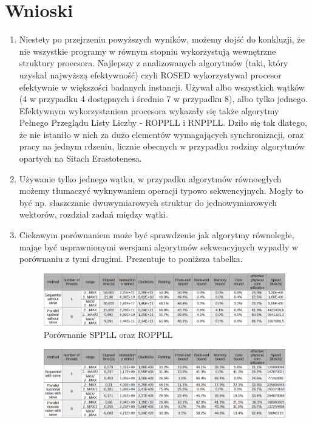 \documentclass{article}
\begin{document}
    \section{Wnioski}    
        \begin{enumerate}
            \item Niestety po przejrzeniu powyższych wyników, możemy dojść do konkluzji, że nie wszystkie programy w równym stopniu wykorzystują wewnętrzne struktury proecsora. Najlepszy z analizowanych algorytmów (taki, który uzyskał najwyższą efektywność) czyli \gls{ROSED} wykorzystywał procesor efektywnie w większości badanych instancji. Używał albo wszystkich wątków (4 w przypadku 4 dostępnych i średnio 7 w przypadku 8), albo tylko jednego. Efektywnym wykorzystaniem procesora wykazały się także algorytmy Pełnego Przeglądu Listy Liczby - \gls{ROPPLL} i \gls{RNPPLL}. Dziło się tak dlatego, że nie istaniło w nich za dużo elementów wymagających synchronizacji, oraz pracy na jednym rdzeniu, licznie obecnych w przypadku rodziny algorytmów opartych na Sitach Erastotenesa.
            \item Używanie tylko jednego wątku, w przypadku algorytmów równoegłych możemy tłumaczyć wyknywaniem operacji typowo sekwencyjnych. Mogły to być np. słaszczanie dwuwymiarowych struktur do jednowymiarowych wektorów, rozdział zadań między wątki.
            \item Ciekawym porównaniem może być sprawdzenie jak algorytmy równoległe, mająe być usprawnionymi wersjami algorytmów sekwencyjnych wypadły w porównaniu z tymi drugimi. Prezentuje to poniższa tabelka.
                \begin{figure}[H]
                    \includegraphics[width=13cm]{parallel-seq-comp.png}
                    \caption{Porównanie \gls{SPPLL} oraz \gls{ROPPLL}}
                \end{figure}
                \begin{figure}[H]
                    \includegraphics[width=13cm]{sieve-comp}

\end{figure}
\end{enumerate}
\end{document}
